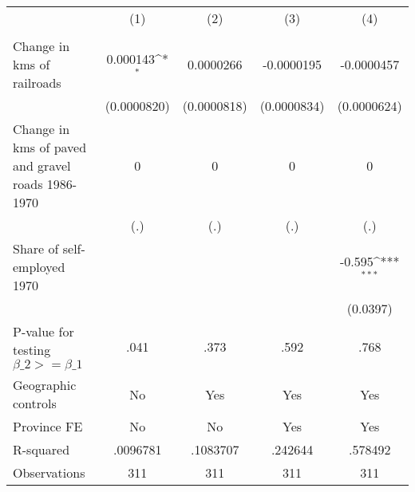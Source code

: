 {
\def\sym#1{\ifmmode^{#1}\else\(^{#1}\)\fi}
\begin{tabular}{l*{4}{c}}
\hline\hline
                &\multicolumn{1}{c}{(1)}&\multicolumn{1}{c}{(2)}&\multicolumn{1}{c}{(3)}&\multicolumn{1}{c}{(4)}\\
                &\multicolumn{1}{c}{}&\multicolumn{1}{c}{}&\multicolumn{1}{c}{}&\multicolumn{1}{c}{}\\
\hline
Change in kms of railroads& 0.000143\sym{*}  &0.0000266         &-0.0000195         &-0.0000457         \\
                &(0.0000820)         &(0.0000818)         &(0.0000834)         &(0.0000624)         \\
[1em]
Change in kms of paved and gravel roads 1986-1970&        0         &        0         &        0         &        0         \\
                &      (.)         &      (.)         &      (.)         &      (.)         \\
[1em]
Share of self-employed 1970&                  &                  &                  &   -0.595\sym{***}\\
                &                  &                  &                  & (0.0397)         \\
\hline
P-value for testing $\beta\_{2} >= \beta\_{1}$&     .041         &     .373         &     .592         &     .768         \\
Geographic controls&       No         &      Yes         &      Yes         &      Yes         \\
Province FE     &       No         &       No         &      Yes         &      Yes         \\
R-squared       & .0096781         & .1083707         &  .242644         &  .578492         \\
Observations    &      311         &      311         &      311         &      311         \\
\hline\hline
\end{tabular}
}
